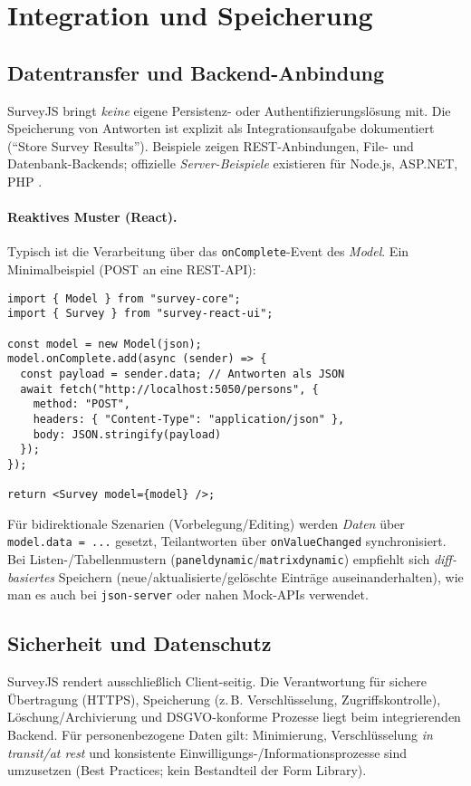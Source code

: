 \documentclass[11pt,a4paper]{article}
\begin{document}
\section{Integration und Speicherung}
\subsection*{Datentransfer und Backend-Anbindung}
SurveyJS bringt \emph{keine} eigene Persistenz- oder Authentifizierungslösung mit. Die Speicherung von Antworten ist explizit als Integrationsaufgabe dokumentiert (\enquote{Store Survey Results}). Beispiele zeigen REST-Anbindungen, File- und Datenbank-Backends; offizielle \emph{Server-Beispiele} existieren für Node.js, ASP.NET, PHP \cite{surveyjs-store-results, surveyjs-servers}.

\paragraph{Reaktives Muster (React).} Typisch ist die Verarbeitung über das \verb|onComplete|-Event des \emph{Model}. Ein Minimalbeispiel (POST an eine REST-API):

\begin{verbatim}
import { Model } from "survey-core";
import { Survey } from "survey-react-ui";

const model = new Model(json);
model.onComplete.add(async (sender) => {
  const payload = sender.data; // Antworten als JSON
  await fetch("http://localhost:5050/persons", {
    method: "POST",
    headers: { "Content-Type": "application/json" },
    body: JSON.stringify(payload)
  });
});

return <Survey model={model} />;
\end{verbatim}

Für bidirektionale Szenarien (Vorbelegung/Editing) werden \emph{Daten} über \verb|model.data = ...| gesetzt, Teilantworten über \verb|onValueChanged| synchronisiert. Bei Listen-/Tabellenmustern (\texttt{paneldynamic}/\texttt{matrixdynamic}) empfiehlt sich \emph{diff-basiertes} Speichern (neue/aktualisierte/gelöschte Einträge auseinanderhalten), wie man es auch bei \texttt{json-server} oder nahen Mock-APIs verwendet.

\subsection*{Sicherheit und Datenschutz}
SurveyJS rendert ausschließlich Client-seitig. Die Verantwortung für sichere Übertragung (HTTPS), Speicherung (z.\,B. Verschlüsselung, Zugriffskontrolle), Löschung/Archivierung und DSGVO-konforme Prozesse liegt beim integrierenden Backend. Für personenbezogene Daten gilt: Minimierung, Verschlüsselung \emph{in transit/at rest} und konsistente Einwilligungs-/Informationsprozesse sind umzusetzen (Best Practices; kein Bestandteil der Form Library).
\end{document}

